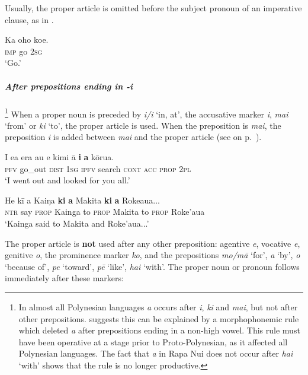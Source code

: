 Usually, the proper article is omitted before the subject pronoun of an imperative clause, as in . 

\ea\label{ex:5.190}
\gll Ka oho koe. \\
\textsc{imp} go \textsc{2sg} \\

\glt 
‘Go.’ \textstyleExampleref{[Notes]}
\z

\subparagraph{After prepositions ending in \textit{-i}}\footnote{\label{fn:281} In almost all Polynesian languages \textit{a} occurs after \textit{i}, \textit{ki} and \textit{mai}, but not after other prepositions. \citet[58]{Clark1976} suggests this can be explained by a morphophonemic rule which deleted \textit{a} after prepositions ending in a non-high vowel. This rule must have been operative at a stage prior to Proto-Polynesian, as it affected all Polynesian languages. The fact that \textit{a} in Rapa Nui does not occur after \textit{hai} ‘with’ shows that the rule is no longer productive.} When a proper noun is preceded by \textit{{\ꞌ}i/i} ‘in, at’, the accusative marker \textit{i}, \textit{mai} ‘from’ or \textit{ki} ‘to’, the proper article is used. When the preposition is \textit{mai}, the preposition \textit{i} is added between \textit{mai} and the proper article (see  on p.~\pageref{ex:4.272}).

\ea\label{ex:5.191}
\gll I e{\ꞌ}a era au e kimi {\ꞌ}ā \textbf{i} \textbf{a} kōrua. \\
\textsc{pfv} go\_out \textsc{dist} \textsc{1sg} \textsc{ipfv} search \textsc{cont} \textsc{acc} \textsc{prop} \textsc{2pl} \\

\glt 
‘I went out and looked for you all.’ \textstyleExampleref{[R182.012]} 
\z

\ea\label{ex:5.192}
\gll He kī a Kaiŋa \textbf{ki} \textbf{a} Makita \textbf{ki} \textbf{a} Roke{\ꞌ}aua... \\
\textsc{ntr} say \textsc{prop} Kainga to \textsc{prop} Makita to \textsc{prop} Roke’aua \\

\glt 
‘Kainga said to Makita and Roke’aua...’ \textstyleExampleref{[R243.063]} 
\z

The proper article is \textbf{not} used after any other preposition: agentive \textit{e}, vocative \textit{e}, genitive \textit{o}, the prominence marker \textit{ko}, and the prepositions \textit{mo/mā} ‘for’, \textit{a} ‘by’, \textit{{\ꞌ}o} ‘because of’, \textit{pe} ‘toward’, \textit{pē} ‘like’, \textit{hai} ‘with’. The proper noun or pronoun follows immediately after these markers:

